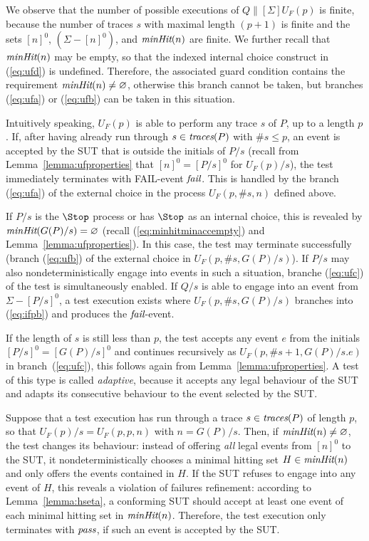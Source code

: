 We observe that the number of possible executions of $Q\parallel[\Sigma]
U_F(p)$ is finite, because the number of traces $s$ with maximal length
$(p+1)$ is finite and the sets $[n]^0$, $(\Sigma - [n]^0)$, and
$\text{\it minHit}(n)$ are finite. We further recall that $\text{\it minHit}(n)$ may be
empty, so that the indexed internal choice construct in (\ref{eq:ufd}) 
is undefined. Therefore, the associated guard condition contains the requirement
$\text{\it minHit}(n)\neq\varnothing$, otherwise this branch cannot be taken,
but branches (\ref{eq:ufa}) or (\ref{eq:ufb}) can be taken in this situation.

Intuitively speaking, $U_F(p)$ is able to perform any trace $s$ of $P$, up to
a length $p$. If, after having already run through $s\in\text{\it traces}(P)$ with
$\#s \le p$, an event is accepted by the SUT that is outside the initials of $P/s$
 (recall from Lemma~\ref{lemma:ufproperties} that $[n]^0 = [P/s]^0$ for $U_F(p)/s$),
the test immediately terminates with FAIL-event ${\text{\it fail}}$. This is handled by
the branch (\ref{eq:ufa}) of the external choice in the process $U_F(p,\#s,n)$
defined above.

If $P/s$ is the $\Stop$ process or has $\Stop$ as an internal choice,
this is revealed by $\text{\it minHit}(G(P)/s) = \varnothing$ (recall (\ref{eq:minhitminaccempty}) and
Lemma~\ref{lemma:ufproperties}). 
In this case, the test may terminate successfully (branch (\ref{eq:ufb}) of
the external choice in $U_F(p,\#s,G(P)/s)$). 
If $P/s$ may also nondeterministically engage into events in such a situation, branche 
 (\ref{eq:ufc}) of the test is
simultaneously enabled. If $Q/s$ is able to engage into an event from 
$\Sigma - [P/s]^0$, a test execution exists where $U_F(p,\#s,G(P)/s)$ branches
into (\ref{eq:ifpb}) and produces the ${\text{\it fail}}$-event.


If the length of $s$ is still less than $p$, the test accepts any event $e$ from
the initials $[P/s]^0 = [G(P)/s]^0$ and continues recursively as $U_F(p,\#s+1,G(P)/s.e)$ in
branch~(\ref{eq:ufc}), this follows again from  Lemma~\ref{lemma:ufproperties}. 
A test of this type is called \emph{adaptive}, because
it accepts any legal behaviour of the SUT and adapts its consecutive
behaviour to the event selected by the SUT.

Suppose that a test execution has run through a trace 
$s\in\text{\it traces}(P)$ of length $p$, so that $U_F(p)/s = U_F(p,p,n)$ with $n = G(P)/s$. 
Then,   if
$\text{\it minHit}(n)\neq \varnothing$, the test changes its behaviour: instead of
offering {\it all} legal events from $[n]^0$ to the SUT, it
nondeterministically chooses a minimal hitting set   $H\in \text{\it minHit}(n)$ 
and
only offers the events contained in $H$. If the SUT refuses to engage
into any event of $H$, this reveals a violation of failures refinement:
according to Lemma~\ref{lemma:hseta}, a conforming SUT should accept at least
one event of each minimal hitting set in $\text{\it minHit}(n)$. Therefore, the test
execution
only terminates with  ${\text{\it pass}}$, if such an event is accepted by the SUT.

